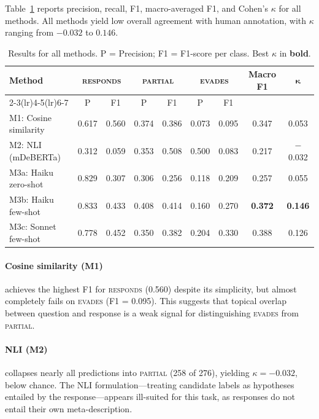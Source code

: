 \documentclass[11pt]{article}
\begin{document}
Table~\ref{tab:results} reports precision, recall, F1, macro-averaged F1, and Cohen's $\kappa$ for all methods. All methods yield low overall agreement with human annotation, with $\kappa$ ranging from $-0.032$ to $0.146$.

\begin{table}[t]
\centering
\small
\begin{tabular}{lcccccccc}
\toprule
\multirow{2}{*}{\textbf{Method}} & \multicolumn{2}{c}{\textsc{responds}} & \multicolumn{2}{c}{\textsc{partial}} & \multicolumn{2}{c}{\textsc{evades}} & \multirow{2}{*}{\textbf{Macro F1}} & \multirow{2}{*}{$\boldsymbol{\kappa}$} \\
\cmidrule(lr){2-3}\cmidrule(lr){4-5}\cmidrule(lr){6-7}
 & P & F1 & P & F1 & P & F1 & & \\
\midrule
M1: Cosine similarity   & 0.617 & 0.560 & 0.374 & 0.386 & 0.073 & 0.095 & 0.347 & 0.053 \\
M2: NLI (mDeBERTa)      & 0.312 & 0.059 & 0.353 & 0.508 & 0.500 & 0.083 & 0.217 & $-$0.032 \\
M3a: Haiku zero-shot    & 0.829 & 0.307 & 0.306 & 0.256 & 0.118 & 0.209 & 0.257 & 0.055 \\
M3b: Haiku few-shot     & 0.833 & 0.433 & 0.408 & 0.414 & 0.160 & 0.270 & \textbf{0.372} & \textbf{0.146} \\
M3c: Sonnet few-shot    & 0.778 & 0.452 & 0.350 & 0.382 & 0.204 & 0.330 & 0.388 & 0.126 \\
\bottomrule
\end{tabular}
\caption{Results for all methods. P = Precision; F1 = F1-score per class. Best $\kappa$ in \textbf{bold}.}
\label{tab:results}
\end{table}

\paragraph{Cosine similarity (M1)} achieves the highest F1 for \textsc{responds} (0.560) despite its simplicity, but almost completely fails on \textsc{evades} (F1 = 0.095). This suggests that topical overlap between question and response is a weak signal for distinguishing \textsc{evades} from \textsc{partial}.

\paragraph{NLI (M2)} collapses nearly all predictions into \textsc{partial} (258 of 276), yielding $\kappa = -0.032$, below chance. The NLI formulation---treating candidate labels as hypotheses entailed by the response---appears ill-suited for this task, as responses do not entail their own meta-description.
\end{document}
